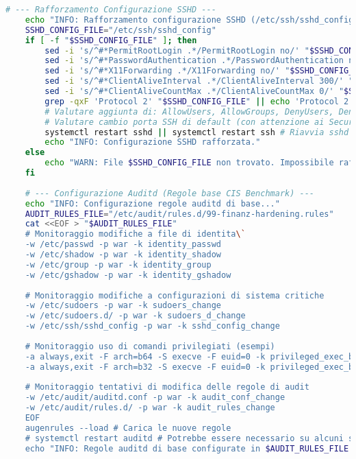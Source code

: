\begin{lstlisting}[language=Bash, style=bash, caption={Script di Hardening del Sistema Operativo (hardening\_script.sh)}, label={lst:hardening_script_cap2}]
    # --- Rafforzamento Configurazione SSHD ---
    echo "INFO: Rafforzamento configurazione SSHD (/etc/ssh/sshd_config)..."
    SSHD_CONFIG_FILE="/etc/ssh/sshd_config"
    if [ -f "$SSHD_CONFIG_FILE" ]; then
        sed -i 's/^#*PermitRootLogin .*/PermitRootLogin no/' "$SSHD_CONFIG_FILE"
        sed -i 's/^#*PasswordAuthentication .*/PasswordAuthentication no/' "$SSHD_CONFIG_FILE" # Richiede key-based auth
        sed -i 's/^#*X11Forwarding .*/X11Forwarding no/' "$SSHD_CONFIG_FILE"
        sed -i 's/^#*ClientAliveInterval .*/ClientAliveInterval 300/' "$SSHD_CONFIG_FILE"
        sed -i 's/^#*ClientAliveCountMax .*/ClientAliveCountMax 0/' "$SSHD_CONFIG_FILE"
        grep -qxF 'Protocol 2' "$SSHD_CONFIG_FILE" || echo 'Protocol 2' >> "$SSHD_CONFIG_FILE"
        # Valutare aggiunta di: AllowUsers, AllowGroups, DenyUsers, DenyGroups
        # Valutare cambio porta SSH di default (con attenzione ai Security Groups)
        systemctl restart sshd || systemctl restart ssh # Riavvia sshd per applicare le modifiche
        echo "INFO: Configurazione SSHD rafforzata."
    else
        echo "WARN: File $SSHD_CONFIG_FILE non trovato. Impossibile rafforzare SSHD."
    fi
    
    # --- Configurazione Auditd (Regole base CIS Benchmark) ---
    echo "INFO: Configurazione regole auditd di base..."
    AUDIT_RULES_FILE="/etc/audit/rules.d/99-finanz-hardening.rules"
    cat <<EOF > "$AUDIT_RULES_FILE"
    # Monitoraggio modifiche a file di identita\`
    -w /etc/passwd -p war -k identity_passwd
    -w /etc/shadow -p war -k identity_shadow
    -w /etc/group -p war -k identity_group
    -w /etc/gshadow -p war -k identity_gshadow
    
    # Monitoraggio modifiche a configurazioni di sistema critiche
    -w /etc/sudoers -p war -k sudoers_change
    -w /etc/sudoers.d/ -p war -k sudoers_d_change
    -w /etc/ssh/sshd_config -p war -k sshd_config_change
    
    # Monitoraggio uso di comandi privilegiati (esempi)
    -a always,exit -F arch=b64 -S execve -F euid=0 -k privileged_exec_b64
    -a always,exit -F arch=b32 -S execve -F euid=0 -k privileged_exec_b32
    
    # Monitoraggio tentativi di modifica delle regole di audit
    -w /etc/audit/auditd.conf -p war -k audit_conf_change
    -w /etc/audit/rules.d/ -p war -k audit_rules_change
    EOF
    augenrules --load # Carica le nuove regole
    # systemctl restart auditd # Potrebbe essere necessario su alcuni sistemi
    echo "INFO: Regole auditd di base configurate in $AUDIT_RULES_FILE."
    

\end{lstlisting}
